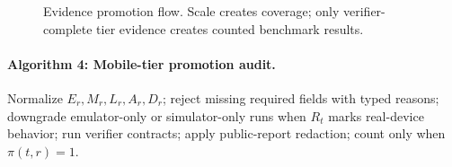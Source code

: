 \documentclass{article}
\begin{document}
\begin{figure}[t]
\centering
\scriptsize
\setlength{\tabcolsep}{2pt}
\renewcommand{\arraystretch}{1.12}
\caption{Evidence promotion flow. Scale creates coverage; only verifier-complete tier evidence creates counted benchmark results.}
\label{fig:promotion-flow}
\end{figure}

\paragraph{Algorithm 4: Mobile-tier promotion audit.}
Normalize \(E_r,M_r,L_r,A_r,D_r\); reject missing required fields with typed reasons; downgrade emulator-only or simulator-only runs when \(R_t\) marks real-device behavior; run verifier contracts; apply public-report redaction; count only when \(\pi(t,r)=1\).
\end{document}
